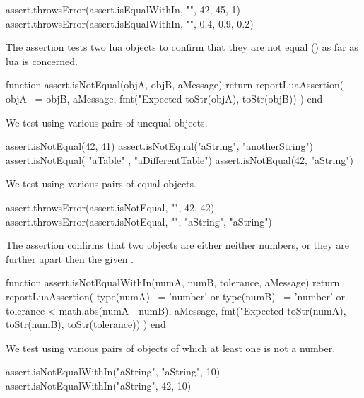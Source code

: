 \startLuaTest
  assert.throwsError(assert.isEqualWithIn, "", 42, 45, 1)
  assert.throwsError(assert.isEqualWithIn, "", 0.4, 0.9, 0.2)
\stopLuaTest
\stopTestCase

\stopTestSuite


The  assertion tests two lua objects to confirm 
that they are not equal (\type{~=}) as far as lua is concerned. 

\startLuaCode
function assert.isNotEqual(objA, objB, aMessage)
  return reportLuaAssertion(
    objA ~= objB,
    aMessage,
    fmt("Expected %
      toStr(objA), toStr(objB))
  )
end
\stopLuaCode


We test using various pairs of unequal objects.

\startLuaTest
  assert.isNotEqual(42, 41)
  assert.isNotEqual("aString", "anotherString")
  assert.isNotEqual({ "aTable" }, { "aDifferentTable"})
  assert.isNotEqual(42, "aString")
\stopLuaTest
\stopTestCase


We test using various pairs of equal objects.

\startLuaTest
  assert.throwsError(assert.isNotEqual, "", 42, 42)
  assert.throwsError(assert.isNotEqual, "", "aString", "aString")
\stopLuaTest
\stopTestCase

\stopTestSuite


The  assertion confirms that two objects are 
either neither numbers, or they are further apart then the given 
. 

\startLuaCode
function assert.isNotEqualWithIn(numA, numB, tolerance, aMessage)
  return reportLuaAssertion(
    type(numA) ~= 'number' or type(numB) ~= 'number'
    or tolerance < math.abs(numA - numB), 
    aMessage,
    fmt("Expected %
      toStr(numA), toStr(numB), toStr(tolerance))
  )
end
\stopLuaCode


We test using various pairs of objects of which at least one is not a 
number. 

\startLuaTest
  assert.isNotEqualWithIn("aString", "aString", 10)
  assert.isNotEqualWithIn("aString", 42, 10)
\stopLuaTest
\stopTestCase

